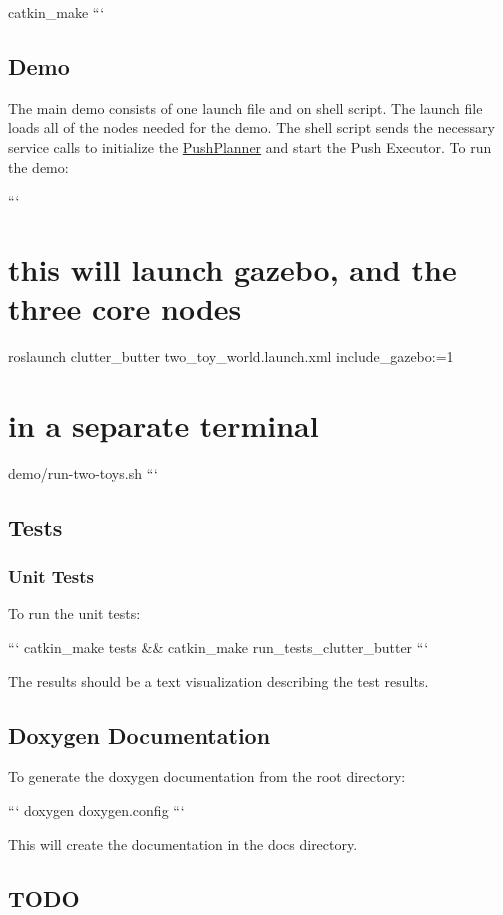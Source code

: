 catkin\-\_\-make ```

\subsection*{Demo}

The main demo consists of one launch file and on shell script. The launch file loads all of the nodes needed for the demo. The shell script sends the necessary service calls to initialize the \hyperlink{classPushPlanner}{Push\-Planner} and start the Push Executor. To run the demo\-:

``` \section*{this will launch gazebo, and the three core nodes}

roslaunch clutter\-\_\-butter two\-\_\-toy\-\_\-world.\-launch.\-xml include\-\_\-gazebo\-:=1

\section*{in a separate terminal}

demo/run-\/two-\/toys.\-sh ```

\subsection*{Tests}

\subsubsection*{Unit Tests}

To run the unit tests\-:

``` catkin\-\_\-make tests \&\& catkin\-\_\-make run\-\_\-tests\-\_\-clutter\-\_\-butter ```

The results should be a text visualization describing the test results.

\subsection*{Doxygen Documentation}

To generate the doxygen documentation from the root directory\-:

``` doxygen doxygen.\-config ```

This will create the documentation in the docs directory.

\subsection*{T\-O\-D\-O}